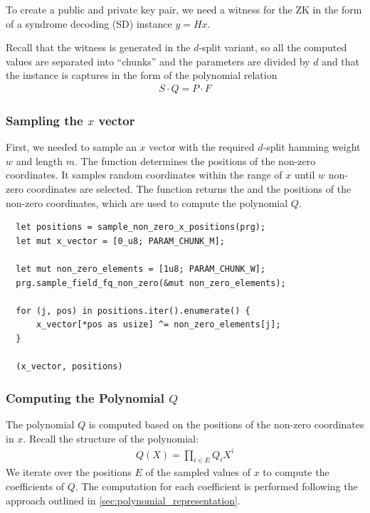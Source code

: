 \documentclass[11pt]{report}
\theoremstyle{definition}
\theoremstyle{plain}
\begin{document}
To create a public and private key pair, we need a witness for the ZK in the form of a syndrome decoding (SD) instance $y = Hx$.

Recall that the witness is generated in the $d$-split variant, so all the computed values are separated into ``chunks'' and the parameters are divided by $d$ and that the instance is captures in the form of the polynomial relation
\begin{align*}
  S\cdot Q = P\cdot F
\end{align*}

\subsubsection{Sampling the $x$ vector}

First, we needed to sample an $x$ vector with the required $d$-split hamming weight $w$ and length $m$. The function  determines the positions of the non-zero coordinates. It samples random coordinates within the range of $x$ until $w$ non-zero coordinates are selected. The function returns the  and the positions of the non-zero coordinates, which are used to compute the polynomial $Q$.

\begin{verbatim}
  let positions = sample_non_zero_x_positions(prg);
  let mut x_vector = [0_u8; PARAM_CHUNK_M];
  
  let mut non_zero_elements = [1u8; PARAM_CHUNK_W];
  prg.sample_field_fq_non_zero(&mut non_zero_elements);

  for (j, pos) in positions.iter().enumerate() {
      x_vector[*pos as usize] ^= non_zero_elements[j];
  }

  (x_vector, positions)
\end{verbatim}

\subsubsection{Computing the Polynomial $Q$}

The polynomial $Q$ is computed based on the positions of the non-zero coordinates in $x$. Recall the structure of the polynomial:
\begin{align*}
  Q(X) = \prod_{i\in E} Q_i X^i
\end{align*}
We iterate over the positions $E$ of the sampled values of $x$ to compute the coefficients of $Q$. The computation for each coefficient is performed following the approach outlined in \autoref{sec:polynomial_representation}.
\end{document}
